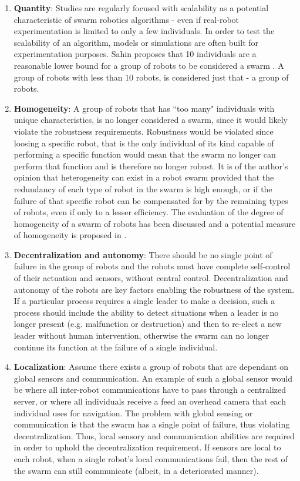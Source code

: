 \begin{enumerate}

\item \textbf{Quantity}: Studies are regularly focused with scalability as a potential characteristic of swarm robotics algorithms - even if real-robot experimentation is limited to only a few individuals. In order to test the scalability of an algorithm, models or simulations are often built for experimentation purposes. Sahin proposes that 10 individuals are a reasonable lower bound for a group of robots to be considered a swarm \cite{csahin2005swarm}. A group of robots with less than 10 robots, is considered just that - a group of robots. 

\item \textbf{Homogeneity}: A group of robots that has ``too many" individuals with unique characteristics, is no longer considered a swarm, since it would likely violate the robustness requirements. Robustness would be violated since loosing a specific robot, that is the only individual of its kind capable of performing a specific function would mean that the swarm no longer can perform that function and is therefore no longer robust. It is of the author's opinion that heterogeneity can exist in a robot swarm provided that the redundancy of each type of robot in the swarm is high enough, or if the failure of that specific robot can be compensated for by the remaining types of robots, even if only to a lesser efficiency. The evaluation of the degree of homogeneity of a swarm of robots has been discussed and a potential measure of homogeneity is proposed in \cite{balch2000hierarchic}.

\item \textbf{Decentralization and autonomy}: There should be no single point of failure in the group of robots and the robots must have complete self-control of their actuation and sensors, without central control. Decentralization and autonomy of the robots are key factors enabling the robustness of the system. If a particular process requires a single leader to make a decision, such a process should include the ability to detect situations when a leader is no longer present (e.g. malfunction or destruction) and then to re-elect a new leader without human intervention, otherwise the swarm can no longer continue its function at the failure of a single individual.

\item \textbf{Localization}: Assume there exists a group of robots that are dependant on global sensors and communication. An example of such a global sensor would be where all inter-robot communications have to pass through a centralized server, or where all individuals receive a feed an overhead camera that each individual uses for navigation. The problem with global sensing or communication is that the swarm has a single point of failure, thus violating decentralization. Thus, local sensory and communication abilities are required in order to uphold the decentralization requirement. If sensors are local to each robot, when a single robot's local communications fail, then the rest of the swarm can still communicate (albeit, in a deteriorated manner).


\end{enumerate}
